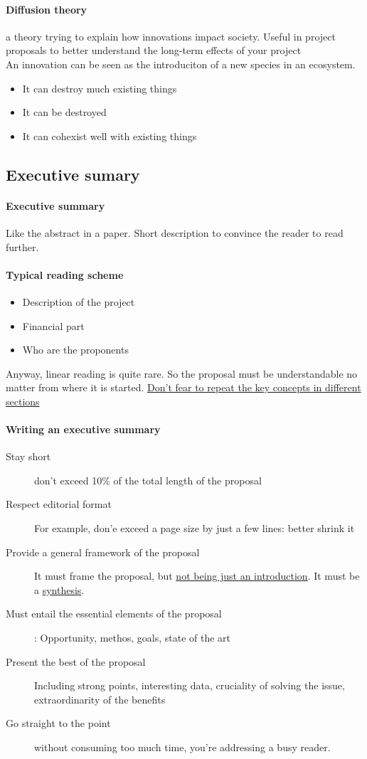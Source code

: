 \documentclass{article}
\begin{document}
\paragraph{Diffusion theory} a theory trying to explain how innovations impact society. Useful in project proposals to better understand the long-term effects of your project\\
An innovation can be seen as the introduciton of a new species in an ecosystem. 
\begin{itemize}
\item It can destroy much existing things
\item It can be destroyed
\item It can cohexist well with existing things
\end{itemize}


\subsection{Executive sumary}
\paragraph{Executive summary} Like the abstract in a paper. Short description to convince the reader to read further.
\paragraph{Typical reading scheme}
\begin{itemize}
\item Description of the project
\item Financial part
\item Who are the proponents
\end{itemize}
Anyway, linear reading is quite rare. So the proposal must be understandable no matter from where it is started. \underline{Don't fear to repeat the key concepts in different sections}

\paragraph{Writing an executive summary}
\begin{description}
\item[Stay short] don't exceed 10\% of the total length of the proposal
\item[Respect editorial format] For example, don'e exceed a page size by just a few lines: better shrink it
\item[Provide a general framework of the proposal] It must frame the proposal, but \underline{not being just an introduction}. It must be a \underline{synthesis}.
\item[Must entail the essential elements of the proposal]: Opportunity, methos, goals, state of the art
\item[Present the best of the proposal] Including strong points, interesting data, cruciality of solving the issue, extraordinarity of the benefits
\item[Go straight to the point] without consuming too much time, you're addressing a busy reader.
\end{description}
\end{document}

